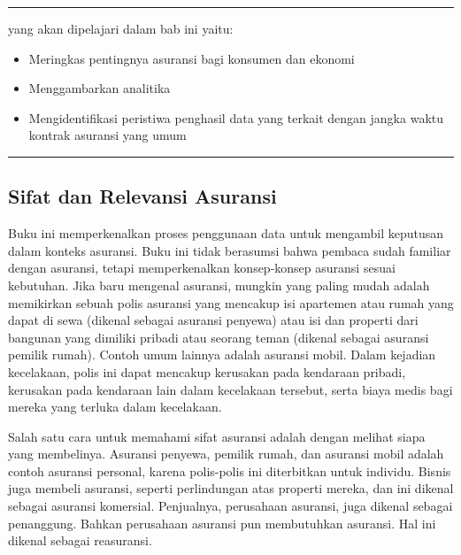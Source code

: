 \documentclass[
]{book}
\providecommand{\tightlist}{%
  \setlength{\itemsep}{0pt}\setlength{\parskip}{0pt}}
\begin{document}
\begin{center}\rule{0.5\linewidth}{0.5pt}\end{center}

yang akan dipelajari dalam bab ini yaitu:

\begin{itemize}
\tightlist
\item
  Meringkas pentingnya asuransi bagi konsumen dan ekonomi
\item
  Menggambarkan analitika
\item
  Mengidentifikasi peristiwa penghasil data yang terkait dengan jangka waktu kontrak asuransi yang umum
\end{itemize}

\begin{center}\rule{0.5\linewidth}{0.5pt}\end{center}

\hypertarget{sifat-dan-relevansi-asuransi}{%
\subsection{Sifat dan Relevansi Asuransi}\label{sifat-dan-relevansi-asuransi}}

Buku ini memperkenalkan proses penggunaan data untuk mengambil keputusan dalam konteks asuransi. Buku ini tidak berasumsi bahwa pembaca sudah familiar dengan asuransi, tetapi memperkenalkan konsep-konsep asuransi sesuai kebutuhan. Jika baru mengenal asuransi, mungkin yang paling mudah adalah memikirkan sebuah polis asuransi yang mencakup isi apartemen atau rumah yang dapat di sewa (dikenal sebagai asuransi penyewa) atau isi dan properti dari bangunan yang dimiliki pribadi atau seorang teman (dikenal sebagai asuransi pemilik rumah). Contoh umum lainnya adalah asuransi mobil. Dalam kejadian kecelakaan, polis ini dapat mencakup kerusakan pada kendaraan pribadi, kerusakan pada kendaraan lain dalam kecelakaan tersebut, serta biaya medis bagi mereka yang terluka dalam kecelakaan.

Salah satu cara untuk memahami sifat asuransi adalah dengan melihat siapa yang membelinya. Asuransi penyewa, pemilik rumah, dan asuransi mobil adalah contoh asuransi personal, karena polis-polis ini diterbitkan untuk individu. Bisnis juga membeli asuransi, seperti perlindungan atas properti mereka, dan ini dikenal sebagai asuransi komersial. Penjualnya, perusahaan asuransi, juga dikenal sebagai penanggung. Bahkan perusahaan asuransi pun membutuhkan asuransi. Hal ini dikenal sebagai reasuransi.
\end{document}
